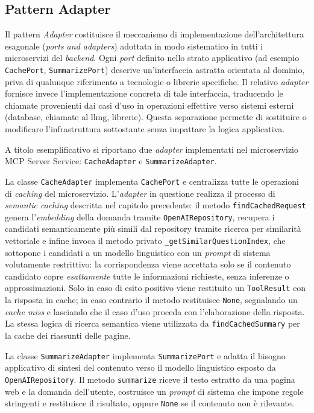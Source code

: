 \subsection{Pattern Adapter}
Il pattern \textit{Adapter} costituisce il meccanismo di implementazione
dell'architettura esagonale (\textit{ports and adapters}) adottata in modo
sistematico in tutti i microservizi del \textit{backend}. Ogni \textit{port}
definito nello strato applicativo (ad esempio \texttt{CachePort},
\texttt{SummarizePort}) descrive un'interfaccia astratta orientata al dominio,
priva di qualunque riferimento a tecnologie o librerie specifiche. Il relativo
\textit{adapter} fornisce invece l'implementazione concreta di tale interfaccia,
traducendo le chiamate provenienti dai casi d'uso in operazioni effettive verso
sistemi esterni (database, chiamate al \gls{llmg}, librerie). Questa separazione
permette di sostituire o modificare l'infrastruttura sottostante senza impattare
la logica applicativa.

A titolo esemplificativo si riportano due \textit{adapter} implementati nel
microservizio MCP Server Service: \texttt{CacheAdapter} e
\texttt{SummarizeAdapter}.

La classe \texttt{CacheAdapter} implementa \texttt{CachePort} e centralizza
tutte le operazioni di \textit{caching} del microservizio. 
L'\textit{adapter} in questione 
realizza il processo di \textit{semantic caching} descritta nel capitolo precedente: 
il metodo \texttt{findCachedRequest}
genera l'\textit{embedding} della domanda tramite \texttt{OpenAIRepository}, recupera i
candidati semanticamente più simili dal repository tramite ricerca per
similarità vettoriale e infine invoca il metodo privato
\texttt{\_getSimilarQuestionIndex}, che sottopone i candidati a un modello
linguistico con un \textit{prompt} di sistema volutamente restrittivo: la
corrispondenza viene accettata solo se il contenuto candidato copre
\emph{esattamente} tutte le informazioni richieste, senza inferenze o
approssimazioni. 
Solo in caso di esito positivo viene restituito un
\texttt{ToolResult} con la risposta in cache; in caso contrario il metodo
restituisce \texttt{None}, segnalando un \textit{cache miss} e lasciando che il
caso d'uso proceda con l'elaborazione della risposta. La stessa logica di
ricerca semantica viene utilizzata da \texttt{findCachedSummary} per la cache
dei riassunti delle pagine.

La classe \texttt{SummarizeAdapter} implementa \texttt{SummarizePort} e adatta
il bisogno applicativo di sintesi del contenuto verso il modello linguistico
esposto da \texttt{OpenAIRepository}. Il metodo \texttt{summarize} riceve il
testo estratto da una pagina web e la domanda dell'utente, costruisce un
\textit{prompt} di sistema che impone regole stringenti e restituisce il risultato, 
oppure \texttt{None} se il contenuto non è
rilevante.


